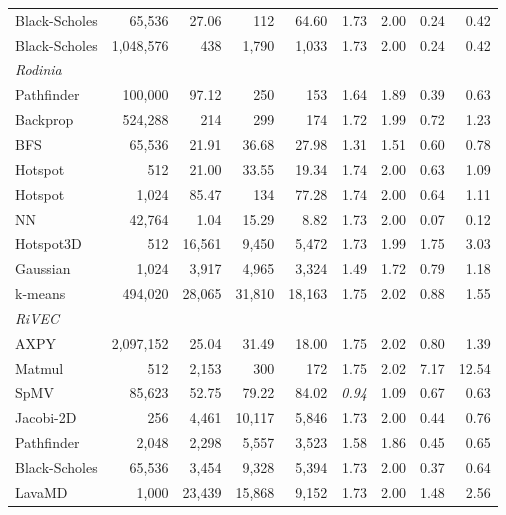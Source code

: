 \begin{table}[p]
\begin{tabular}{lrrrrrrrr}
Black-Scholes & 65{,}536 & 27.06 & 112 & 64.60 & 1.73 & 2.00 & 0.24 & 0.42\\
Black-Scholes & 1{,}048{,}576 & 438 & 1{,}790 & 1{,}033 & 1.73 & 2.00 & 0.24 & 0.42\\
\midrule
\multicolumn{9}{l}{\textit{Rodinia}}\\
Pathfinder & 100{,}000 & 97.12 & 250 & 153 & 1.64 & 1.89 & 0.39 & 0.63\\
Backprop & 524{,}288 & 214 & 299 & 174 & 1.72 & 1.99 & 0.72 & 1.23\\
BFS & 65{,}536 & 21.91 & 36.68 & 27.98 & 1.31 & 1.51 & 0.60 & 0.78\\
Hotspot & 512 & 21.00 & 33.55 & 19.34 & 1.74 & 2.00 & 0.63 & 1.09\\
Hotspot & 1{,}024 & 85.47 & 134 & 77.28 & 1.74 & 2.00 & 0.64 & 1.11\\
NN & 42{,}764 & 1.04 & 15.29 & 8.82 & 1.73 & 2.00 & 0.07 & 0.12\\
Hotspot3D & 512 & 16{,}561 & 9{,}450 & 5{,}472 & 1.73 & 1.99 & 1.75 & 3.03\\
Gaussian & 1{,}024 & 3{,}917 & 4{,}965 & 3{,}324 & 1.49 & 1.72 & 0.79 & 1.18\\
k-means & 494{,}020 & 28{,}065 & 31{,}810 & 18{,}163 & 1.75 & 2.02 & 0.88 & 1.55\\
\midrule
\multicolumn{9}{l}{\textit{RiVEC}}\\
AXPY & 2{,}097{,}152 & 25.04 & 31.49 & 18.00 & 1.75 & 2.02 & 0.80 & 1.39\\
Matmul & 512 & 2{,}153 & 300 & 172 & 1.75 & 2.02 & 7.17 & 12.54\\
SpMV & 85{,}623 & 52.75 & 79.22 & 84.02 & \textit{0.94} & 1.09 & 0.67 & 0.63\\
Jacobi-2D & 256 & 4{,}461 & 10{,}117 & 5{,}846 & 1.73 & 2.00 & 0.44 & 0.76\\
Pathfinder & 2{,}048 & 2{,}298 & 5{,}557 & 3{,}523 & 1.58 & 1.86 & 0.45 & 0.65\\
Black-Scholes & 65{,}536 & 3{,}454 & 9{,}328 & 5{,}394 & 1.73 & 2.00 & 0.37 & 0.64\\
LavaMD & 1{,}000 & 23{,}439 & 15{,}868 & 9{,}152 & 1.73 & 2.00 & 1.48 & 2.56\\
\bottomrule
\end{tabular}

\end{table}

